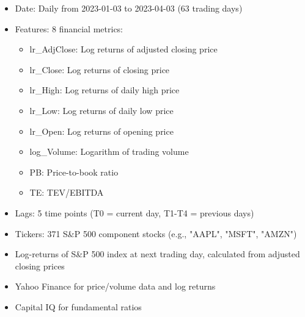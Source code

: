\documentclass[a4paper]{book}
\begin{document}
%
\begin{Details}
\begin{itemize}

\item{} Date: Daily from 2023-01-03 to 2023-04-03 (63 trading days)
\item{} Features: 8 financial metrics:
\begin{itemize}

\item{} lr\_AdjClose: Log returns of adjusted closing price
\item{} lr\_Close: Log returns of closing price
\item{} lr\_High: Log returns of daily high price
\item{} lr\_Low: Log returns of daily low price
\item{} lr\_Open: Log returns of opening price
\item{} log\_Volume: Logarithm of trading volume
\item{} PB: Price-to-book ratio
\item{} TE: TEV/EBITDA

\end{itemize}


\item{} Lags: 5 time points (T0 = current day, T1-T4 = previous days)
\item{} Tickers: 371 S\&P 500 component stocks (e.g., "AAPL", "MSFT", "AMZN")

\end{itemize}


\begin{itemize}

\item{} Log-returns of S\&P 500 index at next trading day, calculated from adjusted closing prices

\end{itemize}

\end{Details}
%
\begin{Source}
\begin{itemize}

\item{} Yahoo Finance for price/volume data and log returns
\item{} Capital IQ for fundamental ratios

\end{itemize}

\end{Source}
\end{document}
